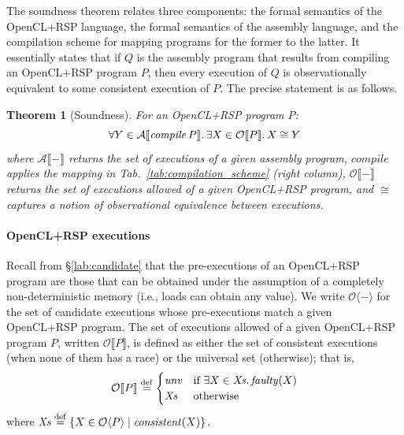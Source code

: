 \documentclass[svgnames,10pt]{sigplanconf}
\newtheorem{theorem}{Theorem}
\theoremstyle{definition}
\newcommand\var[1]{\mathit{#1}}
\newcommand\sem[1]{\llbracket #1 \rrbracket}
\newcommand\Lsem[1]{\mathcal{A}\sem{#1}}
\newcommand\Hsem[1]{\mathcal{O}\sem{#1}}
\newcommand\Hcand[1]{\mathcal{O}\langle #1 \rangle}
\newcommand\eqdef{\overset{{\tiny\rm def}}{=}}
\newcommand\unv{\var{unv}}
\begin{document}
The soundness theorem relates three components: the formal semantics
of the OpenCL+RSP language, the formal semantics of the assembly
language, and the compilation scheme for mapping programs for the
former to the latter. It essentially states that if $Q$ is the
assembly program that results from compiling an OpenCL+RSP program
$P$, then every execution of $Q$ is observationally equivalent to some
consistent execution of $P$.
%
The precise statement is as follows.

\begin{theorem}[Soundness] 
\label{thm:soundness}
For an OpenCL+RSP program $P$:
\[
\forall Y \in \Lsem{\var{compile}\,P}\ldotp \exists X \in
\Hsem{P}\ldotp X \cong Y 
\]
where $\Lsem{-}$ returns the set of executions of a given assembly
program, $\var{compile}$ applies the
mapping in Tab.~\ref{tab:compilation_scheme} (right column), $\Hsem{-}$ returns the set of executions allowed of a given OpenCL+RSP
program, and
$\cong$ captures a notion of observational equivalence between
executions. 
\end{theorem}

\paragraph{OpenCL+RSP executions}
Recall from
\S\ref{lab:candidate} that the pre-executions of an OpenCL+RSP program are those that can be
obtained under the assumption of a completely non-deterministic memory
(i.e., loads can obtain any value).  We write $\Hcand{-}$ for the set of candidate executions whose
pre-executions match a given OpenCL+RSP program.
%
The set of executions allowed of a given OpenCL+RSP program $P$,
written $\Hsem{P}$, is defined as either the set of consistent executions
(when none of them has a race) or the universal set (otherwise); that
is,
\[
\Hsem{P} \eqdef \begin{cases} \unv & \text{if $\exists X \in \var{Xs}\ldotp
\var{faulty}(X)$} \\ \var{Xs} & \text{otherwise} \end{cases}
\]
where $\var{Xs} \eqdef \{X \in \Hcand{P} \mid \var{consistent}(X)\}$.
\end{document}

